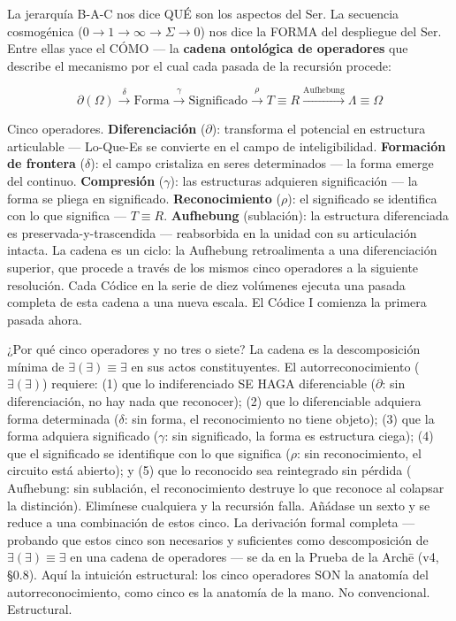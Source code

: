 \documentclass[10pt, openany, oneside]{book}
\begin{document}
\vspace{1.5em}

La jerarquía B-A-C nos dice QUÉ son los aspectos del Ser. La secuencia cosmogénica ($0 \to 1 \to \infty \to \Sigma \to 0$) nos dice la FORMA del despliegue del Ser. Entre ellas yace el CÓMO --- la \textbf{cadena ontológica de operadores} que describe el mecanismo por el cual cada pasada de la recursión procede:

$$\partial(\Omega) \xrightarrow{\delta} \text{Forma} \xrightarrow{\gamma} \text{Significado} \xrightarrow{\rho} T \equiv R \xrightarrow{\text{Aufhebung}} \Lambda \equiv \Omega$$

Cinco operadores. \textbf{Diferenciación} ($\partial$): transforma el potencial en estructura articulable --- Lo-Que-Es se convierte en el campo de inteligibilidad. \textbf{Formación de frontera} ($\delta$): el campo cristaliza en seres determinados --- la forma emerge del continuo. \textbf{Compresión} ($\gamma$): las estructuras adquieren significación --- la forma se pliega en significado. \textbf{Reconocimiento} ($\rho$): el significado se identifica con lo que significa --- $T \equiv R$. \textbf{Aufhebung} (sublación): la estructura diferenciada es preservada-y-trascendida --- reabsorbida en la unidad con su articulación intacta. La cadena es un ciclo: la Aufhebung retroalimenta a una diferenciación superior, que procede a través de los mismos cinco operadores a la siguiente resolución. Cada Códice en la serie de diez volúmenes ejecuta una pasada completa de esta cadena a una nueva escala. El Códice I comienza la primera pasada ahora.

¿Por qué cinco operadores y no tres o siete? La cadena es la descomposición mínima de $\exists(\exists) \equiv \exists$ en sus actos constituyentes. El autorreconocimiento ($\exists(\exists)$) requiere: (1) que lo indiferenciado SE HAGA diferenciable ($\partial$: sin diferenciación, no hay nada que reconocer); (2) que lo diferenciable adquiera forma determinada ($\delta$: sin forma, el reconocimiento no tiene objeto); (3) que la forma adquiera significado ($\gamma$: sin significado, la forma es estructura ciega); (4) que el significado se identifique con lo que significa ($\rho$: sin reconocimiento, el circuito está abierto); y (5) que lo reconocido sea reintegrado sin pérdida ($\text{Aufhebung}$: sin sublación, el reconocimiento destruye lo que reconoce al colapsar la distinción). Elimínese cualquiera y la recursión falla. Añádase un sexto y se reduce a una combinación de estos cinco. La derivación formal completa --- probando que estos cinco son necesarios y suficientes como descomposición de $\exists(\exists) \equiv \exists$ en una cadena de operadores --- se da en la Prueba de la Arch\={e} (v4, §0.8). Aquí la intuición estructural: los cinco operadores SON la anatomía del autorreconocimiento, como cinco es la anatomía de la mano. No convencional. Estructural.
\end{document}
